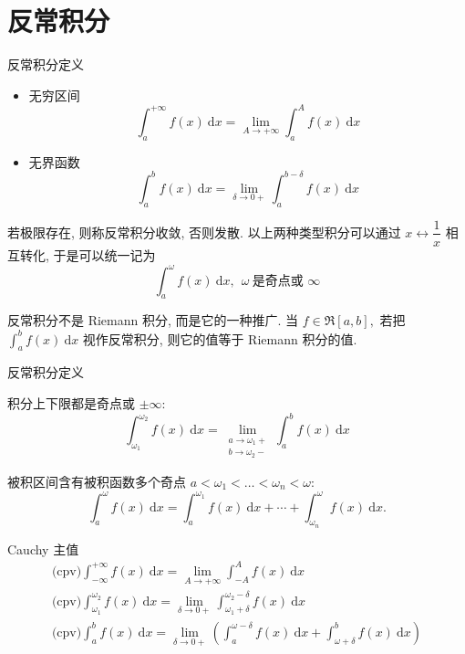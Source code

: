 \section{反常积分}


\begin{frame}{反常积分定义}

\begin{itemize}
\item 无穷区间
\[\int_a^{+\infty} f(x) ~ \mathrm{d} x = \lim\limits_{A \to +\infty} \int_a^A f(x) ~ \mathrm{d} x\]
\item 无界函数
\[\int_a^b f(x) ~ \mathrm{d} x = \lim\limits_{\delta \to 0+} \int_a^{b-\delta} f(x) ~ \mathrm{d} x\]
\end{itemize}
\pause
若极限存在, 则称反常积分收敛, 否则发散. 以上两种类型积分可以通过 $x \leftrightarrow \dfrac{1}{x}$ 相互转化, 于是可以统一记为
\[\int_a^\omega f(x) ~ \mathrm{d} x, ~~ \omega ~ \text{是奇点或 $\infty$}\]

\pause
\vspace{-0.5em}

\begin{attnblock}
反常积分不是 Riemann 积分, 而是它的一种推广. 当 $f \in \mathfrak{R}[a, b],$ 若把 $\int_a^b f(x) ~ \mathrm{d} x$ 视作反常积分, 则它的值等于 Riemann 积分的值.
\end{attnblock}

\end{frame}


\begin{frame}{反常积分定义}

积分上下限都是奇点或 $\pm\infty:$
\[\int_{\omega_1}^{\omega_2} f(x) ~ \mathrm{d} x = \lim\limits_{\substack{a \to \omega_1+ \\ b \to \omega_2-}} \int_a^b f(x) ~ \mathrm{d} x\]

\pause

被积区间含有被积函数多个奇点 $a < \omega_1 < \dots < \omega_n < \omega:$
\[\int_a^{\omega} f(x) ~ \mathrm{d} x = \int_a^{\omega_1} f(x) ~ \mathrm{d} x + \cdots + \int_{\omega_n}^{\omega} f(x) ~ \mathrm{d} x.\]

\pause

Cauchy 主值
\begin{gather*}
\text{(cpv)}\int_{-\infty}^{+\infty} f(x) ~ \mathrm{d} x = \lim\limits_{A \to +\infty} \int_{-A}^A f(x) ~ \mathrm{d} x \\
\text{(cpv)}\int_{\omega_1}^{\omega_2} f(x) ~ \mathrm{d} x = \lim\limits_{\delta \to 0+} \int_{\omega_1+\delta}^{\omega_2-\delta} f(x) ~ \mathrm{d} x \\
\text{(cpv)}\int_{a}^{b} f(x) ~ \mathrm{d} x = \lim\limits_{\delta \to 0+} \left( \int_a^{\omega-\delta} f(x) ~ \mathrm{d} x + \int_{\omega+\delta}^{b} f(x) ~ \mathrm{d} x \right)
\end{gather*}

\end{frame}

